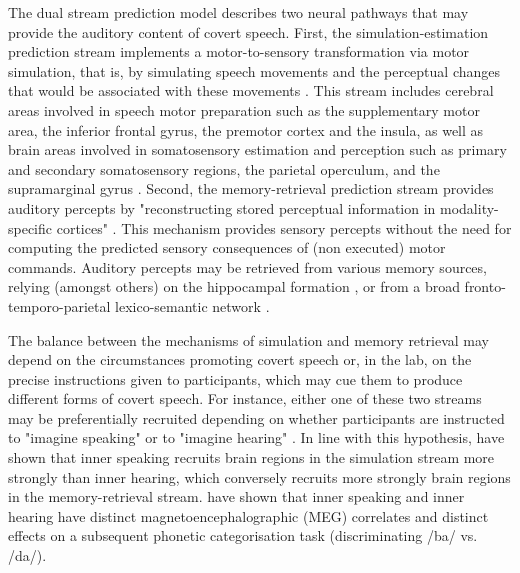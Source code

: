 \documentclass[utf8]{template/frontiersSCNS} %
\begin{document}
The dual stream prediction model \citep{tian_mental_2012, tian_effect_2013, tian_mental_2016} describes two neural pathways that may provide the auditory content of covert speech. First, the simulation-estimation prediction stream implements a motor-to-sensory transformation via motor simulation, that is, by simulating speech movements and the perceptual changes that would be associated with these movements \citep[see also][for a similar proposal]{loevenbruck_cognitive_2018}. This stream includes cerebral areas involved in speech motor preparation such as the supplementary motor area, the inferior frontal gyrus, the premotor cortex and the insula, as well as brain areas involved in somatosensory estimation and perception such as primary and secondary somatosensory regions, the parietal operculum, and the supramarginal gyrus \citep{tian_mental_2016}. Second, the memory-retrieval prediction stream provides auditory percepts by "reconstructing stored perceptual information in modality-specific cortices" \citep{tian_mental_2016}. This mechanism provides sensory percepts without the need for computing the predicted sensory consequences of (non executed) motor commands. Auditory percepts may be retrieved from various memory sources, relying (amongst others) on the hippocampal formation \citep{tian_mental_2016}, or from a broad fronto-temporo-parietal lexico-semantic network \citep[for more details, see][]{tian_mental_2016}.

The balance between the mechanisms of simulation and memory retrieval may depend on the circumstances promoting covert speech or, in the lab, on the precise instructions given to participants, which may cue them to produce different forms of covert speech. For instance, either one of these two streams may be preferentially recruited depending on whether participants are instructed to "imagine speaking" or to "imagine hearing" \citep[see also the distinction between the "inner ear" and the "inner voice", e.g.,][]{smith_subvocalization_1992}. In line with this hypothesis, \cite{tian_mental_2016} have shown that inner speaking recruits brain regions in the simulation stream more strongly than inner hearing, which conversely recruits more strongly brain regions in the memory-retrieval stream. \cite{ma_distinct_2019} have shown that inner speaking and inner hearing have distinct magnetoencephalographic (MEG) correlates and distinct effects on a subsequent phonetic categorisation task (discriminating /ba/ vs. /da/).
\end{document}
